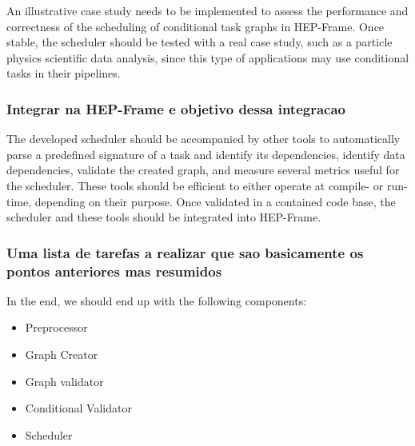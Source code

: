 An illustrative case study needs to be implemented to assess the performance and correctness of the scheduling of conditional task graphs in HEP-Frame. Once stable, the scheduler should be tested with a real case study, such as a particle physics scientific data analysis, since this type of applications may use conditional tasks in their pipelines. 
\subsubsection{Integrar na HEP-Frame e objetivo dessa integracao}

The developed scheduler should be accompanied by other tools to automatically parse a predefined signature of a task and identify its dependencies, identify data dependencies, validate the created graph, and measure several metrics useful for the scheduler. These tools should be efficient to either operate at compile- or run-time, depending on their purpose. Once validated in a contained code base, the scheduler and these tools should be integrated into HEP-Frame.
\subsubsection{Uma lista de tarefas a realizar que sao basicamente os pontos anteriores mas resumidos}
In the end, we should end up with the following components:
\begin{itemize}
    \item Preprocessor
    \item Graph Creator
    \item Graph validator
    \item Conditional Validator
    \item Scheduler
\end{itemize}
